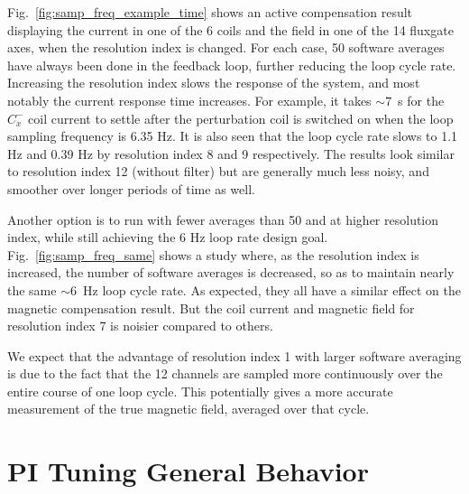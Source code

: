 Fig.~\ref{fig:samp_freq_example_time} shows an active compensation
result displaying the current in one of the 6 coils and the field in
one of the 14 fluxgate axes, when the resolution index is changed.
For each case, 50 software averages have always been done in the
feedback loop, further reducing the loop cycle rate.  Increasing the
resolution index slows the response of the system, and most notably
the current response time increases.  For example, it takes $\sim 7$~s
for the $C_x^-$ coil current to settle after the perturbation coil is
switched on when the loop sampling frequency is 6.35 Hz. It is also
seen that the loop cycle rate slows to 1.1 Hz and 0.39 Hz by
resolution index 8 and 9 respectively.  The results look similar to
resolution index 12 (without filter) but are generally much less
noisy, and smoother over longer periods of time as well.



Another option is to run with fewer averages than 50 and at higher
resolution index, while still achieving the 6 Hz loop rate design
goal.  Fig.~\ref{fig:samp_freq_same} shows a study where, as the
resolution index is increased, the number of software averages is
decreased, so as to maintain nearly the same $\sim 6$~Hz loop cycle
rate.  As expected, they all have a similar effect on the magnetic
compensation result.  But the coil current and magnetic field for
resolution index 7 is noisier compared to others. 

We expect that the advantage of resolution index 1 with larger
software averaging is due to the fact that the 12 channels are sampled
more continuously over the entire course of one loop cycle.  This
potentially gives a more accurate measurement of the true magnetic
field, averaged over that cycle.


% 

\section{PI Tuning General Behavior}\label{sec:pi_behave}

